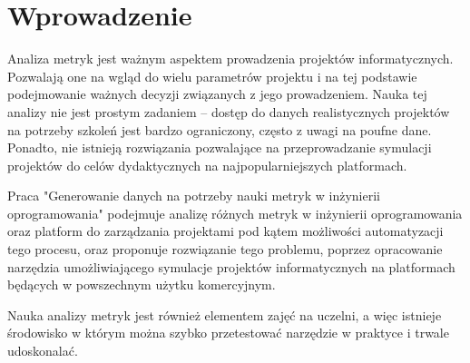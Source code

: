 \section*{Wprowadzenie}
Analiza metryk jest ważnym aspektem prowadzenia projektów informatycznych. Pozwalają one na wgląd do wielu parametrów projektu i na tej podstawie podejmowanie ważnych decyzji związanych z jego prowadzeniem.
Nauka tej analizy nie jest prostym zadaniem -- dostęp do danych realistycznych projektów na potrzeby szkoleń jest bardzo ograniczony, często z uwagi na poufne dane. Ponadto, nie istnieją rozwiązania pozwalające na przeprowadzanie
symulacji projektów do celów dydaktycznych na najpopularniejszych platformach.

Praca "Generowanie danych na potrzeby nauki metryk w inżynierii oprogramowania" podejmuje analizę różnych metryk w inżynierii oprogramowania oraz platform do zarządzania projektami pod kątem możliwości automatyzacji tego procesu,
oraz proponuje rozwiązanie tego problemu, poprzez opracowanie narzędzia umożliwiającego symulacje projektów informatycznych na platformach
będących w powszechnym użytku komercyjnym.

Nauka analizy metryk jest również elementem zajęć na uczelni, a więc istnieje środowisko w którym można szybko przetestować narzędzie w praktyce i trwale udoskonalać.
